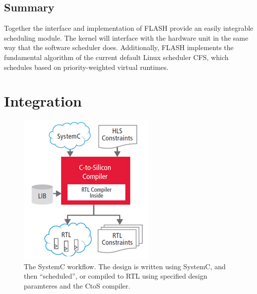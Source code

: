 \documentclass{sig-alternate-10pt}
\begin{document}
\subsection{Summary}
Together the interface and implementation of FLASH provide an easily
integrable scheduling module.  The kernel will interface with the hardware
unit in the same way that the software scheduler does.  Additionally, FLASH
implements the fundamental algorithm of the current default Linux scheduler
CFS, which schedules based on priority-weighted virtual runtimes.


\section{Integration}
\label{sec:integration}
\begin{figure}
	\begin{center}
		\includegraphics[width=0.9\linewidth]{fig/hlsctos.jpg}
		\caption{
			The SystemC workflow. The design is written using SystemC, and then ``scheduled'', or compiled to RTL using specified design paramteres and the CtoS compiler.
		}
		\label{fig:ctos_overview}
	\end{center}
\end{figure}
\end{document}
